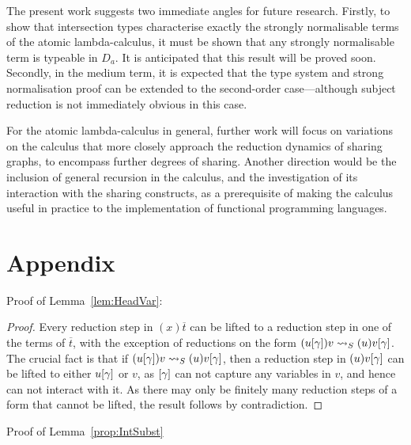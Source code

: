 \documentclass{llncs} %
\begin{document}
The present work suggests two immediate angles for future research. 
%
Firstly, to show that intersection types characterise exactly the strongly normalisable terms of the atomic lambda-calculus, it must be shown that any strongly normalisable term is typeable in $D_a$.
%
It is anticipated that this result will be proved soon.
%
Secondly, in the medium term, it is expected that the type system and strong normalisation proof can be extended to the second-order case---although subject reduction is not immediately obvious in this case.


For the atomic lambda-calculus in general, further work will focus on variations on the calculus that more closely approach the reduction dynamics of sharing graphs, to encompass further degrees of sharing.
%
Another direction would be the inclusion of general recursion in the calculus, and the investigation of its interaction with the sharing constructs, as a prerequisite of making the calculus useful in practice to the implementation of functional programming languages.






\newpage

\section*{Appendix}

Proof of Lemma~\ref{lem:HeadVar}:

\begin{proof}
Every reduction step in $(x)\overline{t}$ can be lifted to a reduction
step in one of the terms of $\overline{t}$, with the exception of
reductions on the form $(u\g)v\ALnotbeta(u)v\g$. The crucial fact is
that if $(u\g)v\ALnotbeta(u)v\g$, then a reduction step in $(u)v\g$
can be lifted to either $u\g$ or $v$, as $\g$ can not capture any
variables in $v$, and hence can not interact with it.
%
As there may only be finitely many reduction steps of a form that
cannot be lifted, the result follows by contradiction.
\end{proof}

Proof of Lemma~\ref{prop:IntSubst}
\end{document}
